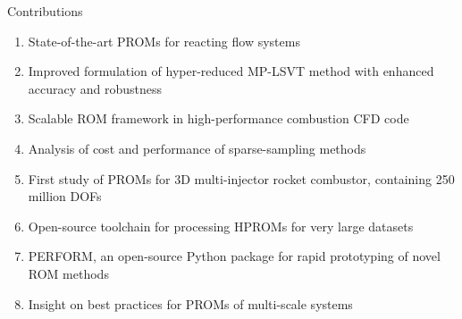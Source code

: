 \documentclass[]{beamer}
\begin{document}
\begin{frame}{Contributions}
    \begin{enumerate}
        \item State-of-the-art PROMs for reacting flow systems
        \item Improved formulation of hyper-reduced MP-LSVT method with enhanced accuracy and robustness
        \item Scalable ROM framework in high-performance combustion CFD code
        \item Analysis of cost and performance of sparse-sampling methods
        \item First study of PROMs for 3D multi-injector rocket combustor, containing 250 million DOFs
        \item Open-source toolchain for processing HPROMs for very large datasets
        \item PERFORM, an open-source Python package for rapid prototyping of novel ROM methods
        \item Insight on best practices for PROMs of multi-scale systems
    \end{enumerate}
\end{frame}
\end{document}

